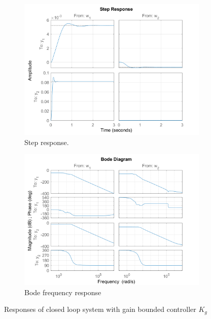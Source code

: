 \documentclass{article}
\begin{document}
\begin{figure}[H]
    \centering
    \begin{subfigure}{0.45\textwidth}
        \centering
        \includegraphics[width=\textwidth]{figures/K_g_step.png}
        \caption{Step response.}
    \end{subfigure}    
    \begin{subfigure}{0.45\textwidth}
        \centering
        \includegraphics[width=\textwidth]{figures/K_g_bode.png}
        \caption{Bode frequency response}
    \end{subfigure}
    \caption{Responses of closed loop system with gain bounded controller $K_g$}
\end{figure}
\end{document}
